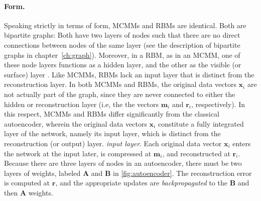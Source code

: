 \paragraph{Form.}
Speaking strictly in terms of form, MCMMs and RBMs are identical.
Both are bipartite graphs: Both have two layers of nodes such that there are no direct connections between nodes of the same layer 
(see the description of bipartite graphs in chapter~\ref{ch:graph}).  Moreover, in a RBM, as in an \ac{MCMM}, 
one of these node layers functions as a hidden layer, and the other as the visible 
(or surface) layer \citep{mohamed-and-hinton:2010}. 
Like MCMMs, RBMs lack an input layer that is distinct from the reconstruction layer. In both MCMMs and RBMs,
the original data vectors $\textbf{x}_i$ are not actually part of the graph, since they are never connected to either the hidden or reconstruction layer (i.e, the the vectors  $\textbf{m}_i$ and  $\textbf{r}_i$, respectively).
In this respect, MCMMs and RBMs differ significantly from the classical autoencoder, wherein the
original data vectors $\textbf{x}_i$ constitute a fully integrated layer of the network, namely its input layer, which is distinct from the reconstruction (or output) layer.
\textit{input layer}. Each original data vector $\textbf{x}_i$ enters the network at the input later, is compressed 
at $\textbf{m}_i$, and reconstructed at $\textbf{r}_i$. Because there are three layers 
of nodes in an autoencoder, there must be two layers of weights, labeled 
$\textbf{A}$ and $\textbf{B}$ 
in \ref{fig:autoencoder}. The reconstruction error is computed at $\textbf{r}$, and the appropriate updates are 
\emph{backpropagated} to the $\textbf{B}$ and then $\textbf{A}$ weights.

